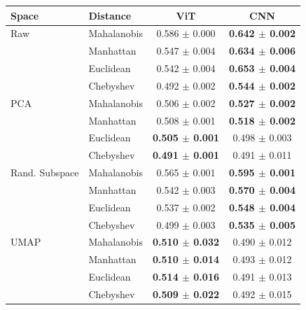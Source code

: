 \begin{tabular}{llcc}
\toprule
Space & Distance & ViT & CNN \\
\midrule
Raw & Mahalanobis & 0.586 $\pm$ 0.000 & \textbf{0.642 $\pm$ 0.002} \\
 & Manhattan & 0.547 $\pm$ 0.004 & \textbf{0.634 $\pm$ 0.006} \\
 & Euclidean & 0.542 $\pm$ 0.004 & \textbf{0.653 $\pm$ 0.004} \\
 & Chebyshev & 0.492 $\pm$ 0.002 & \textbf{0.544 $\pm$ 0.002} \\
\midrule
PCA & Mahalanobis & 0.506 $\pm$ 0.002 & \textbf{0.527 $\pm$ 0.002} \\
 & Manhattan & 0.508 $\pm$ 0.001 & \textbf{0.518 $\pm$ 0.002} \\
 & Euclidean & \textbf{0.505 $\pm$ 0.001} & 0.498 $\pm$ 0.003 \\
 & Chebyshev & \textbf{0.491 $\pm$ 0.001} & 0.491 $\pm$ 0.011 \\
\midrule
Rand. Subspace & Mahalanobis & 0.565 $\pm$ 0.001 & \textbf{0.595 $\pm$ 0.001} \\
 & Manhattan & 0.542 $\pm$ 0.003 & \textbf{0.570 $\pm$ 0.004} \\
 & Euclidean & 0.537 $\pm$ 0.002 & \textbf{0.548 $\pm$ 0.004} \\
 & Chebyshev & 0.499 $\pm$ 0.003 & \textbf{0.535 $\pm$ 0.005} \\
\midrule
UMAP & Mahalanobis & \textbf{0.510 $\pm$ 0.032} & 0.490 $\pm$ 0.012 \\
 & Manhattan & \textbf{0.510 $\pm$ 0.014} & 0.493 $\pm$ 0.012 \\
 & Euclidean & \textbf{0.514 $\pm$ 0.016} & 0.491 $\pm$ 0.013 \\
 & Chebyshev & \textbf{0.509 $\pm$ 0.022} & 0.492 $\pm$ 0.015 \\

\bottomrule
\end{tabular}